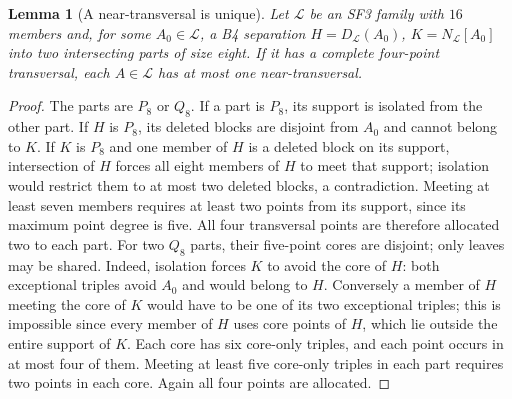 \documentclass[11pt,a4paper]{article}
\numberwithin{equation}{section}
\newtheorem{lemma}[theorem]{Lemma}
\theoremstyle{remark}
\renewcommand{\L}{\mathcal L}
\begin{document}
\begin{lemma}[A near-transversal is unique]
\label{lem:near}
Let $\L $ be an SF3 family with $16$ members and, for some
$ A_0\in\L $, a B4 separation $ H=D_{\L}(A_0)$,
$ K=N_{\L}[A_0]$ into two intersecting parts of size eight.
If it has a complete
four-point transversal, each $ A\in\L $ has at most one
near-transversal.
\end{lemma}
\begin{proof}
The parts are $ P_8$ or $ Q_8$. If a part is $ P_8$, its support
is isolated from the other part. If $ H $ is $ P_8$, its deleted blocks are disjoint from
$ A_0$ and cannot belong to $ K $. If $ K $ is $ P_8$ and one member
of $ H $ is a deleted block on its support, intersection of $ H $
forces all eight members of $ H $ to meet that support; isolation
would restrict them to at most two deleted blocks, a contradiction.
Meeting at least seven members
requires at least two points from its support, since its maximum
point degree is five. All four transversal points are therefore
allocated two to each part. For two $ Q_8$ parts, their five-point
cores are disjoint; only leaves may be shared. Indeed, isolation
forces $ K $ to avoid the core of $ H $: both exceptional triples avoid
$ A_0$ and would belong to $ H $. Conversely a member of $ H $ meeting
the core of $ K $ would have to be one of its two exceptional triples;
this is impossible since every member of $ H $ uses core points of
$ H $, which lie outside the entire support of $ K $.
Each core has six
core-only triples, and each point occurs in at most four of them.
Meeting at least five core-only triples in each part requires
two points in each core. Again all four points are allocated.


\end{proof}
\end{document}
